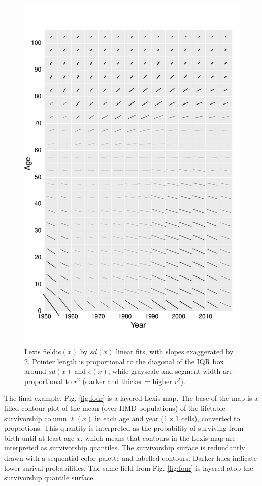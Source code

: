 \documentclass[10pt, twoside, parskip=half]{article}
\begin{document}
\begin{figure}[!t]

{\centering \includegraphics[width=0.8\linewidth]{Figures/Fig3} 

}

\caption{Lexis field:\(e(x)\) by \(sd(x)\) linear fits, with slopes exaggerated by 2. Pointer length is proportional to the diagonal of the IQR box around \(sd(x)\) and \(e(x)\), while grayscale and segment width are proportional to \(r^2\) (darker and thicker = higher \(r^2\)).}\label{fig:three}
\end{figure}

The final example, Fig. \ref{fig:four} is a layered Lexis map. The base of the map is a filled contour plot of the mean (over HMD populations) of the lifetable survivorship column \(\ell(x)\) in each age and year (\(1 \times 1\) cells), converted to proportions. This quantity is interpreted as the probability of surviving from birth until at least age \(x\), which means that contours in the Lexis map are interpreted as survivorship quantiles. The survivorship surface is redundantly drawn with a sequential color palette and labelled contours. Darker hues indicate lower surival probabilities. The same field from Fig. \ref{fig:four} is layered atop the survivorship quantile surface.
\end{document}
